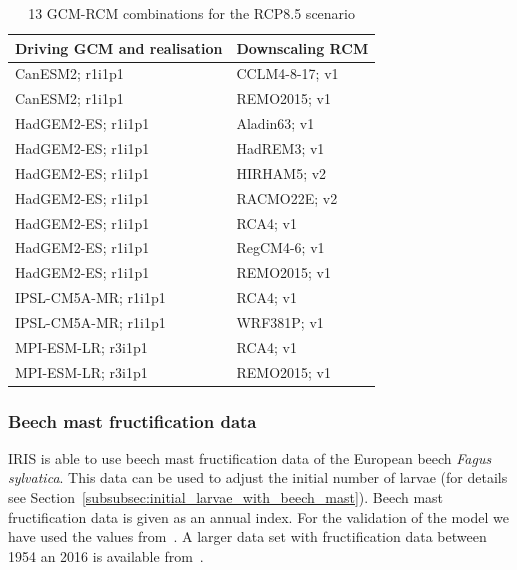 \documentclass[a4paper, 11pt]{scrartcl}
\begin{document}
\begin{table}[h!]
\caption{13 GCM-RCM combinations for the RCP8.5 scenario}
\label{tab:climate_models}
\begin{tabularx}{\textwidth}{@{}ll@{}}
\toprule
\textbf{Driving GCM and realisation}  & \textbf{Downscaling RCM} 	\\
\midrule
CanESM2; r1i1p1 				 	  & CCLM4-8-17; v1  		 	\\
CanESM2; r1i1p1 				 	  & REMO2015; v1 				\\
HadGEM2-ES; r1i1p1 					  & Aladin63; v1 				\\
HadGEM2-ES; r1i1p1 					  & HadREM3; v1 				\\
HadGEM2-ES; r1i1p1 					  & HIRHAM5; v2 				\\
HadGEM2-ES; r1i1p1 					  & RACMO22E; v2 				\\
HadGEM2-ES; r1i1p1 					  & RCA4; v1 					\\
HadGEM2-ES; r1i1p1 					  & RegCM4-6; v1 				\\
HadGEM2-ES; r1i1p1 					  & REMO2015; v1 				\\
IPSL-CM5A-MR; r1i1p1 				  & RCA4; v1 					\\
IPSL-CM5A-MR; r1i1p1 				  & WRF381P; v1 				\\
MPI-ESM-LR; r3i1p1 					  & RCA4; v1 					\\
MPI-ESM-LR; r3i1p1 					  & REMO2015; v1 				\\
\bottomrule
\end{tabularx}
\end{table}


\subsubsection{Beech mast fructification data}\label{subsubsec:beech_mast_data}
IRIS is able to use beech mast fructification data of the European beech \textit{Fagus sylvatica}. This data can be used to adjust the initial number of larvae (for details see Section~\ref{subsubsec:initial_larvae_with_beech_mast}). Beech mast fructification data is given as an annual index. For the validation of the model we have used the values from~\cite{Brugger.2018}. A larger data set with fructification data between 1954 an 2016 is available from~\cite{Konnert.2016}.
\end{document}

